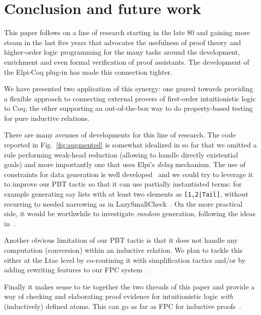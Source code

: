 \section{Conclusion and future work}

This paper follows on a line of research  starting in the late 80 and gaining more steam in the last five years that advocates the usefulness of proof theory and higher-order logic programming  for the many tasks around the development, enrichment and even formal verification of proof assistants. The development of the Elpi-Coq plug-in  has made this connection tighter.

We have presented two application of this synergy: one geared towards
providing a flexible approach to connecting external provers of
first-order intuitionistic logic to Coq; the other supporting an out-of-the-box way to do property-based testing for pure inductive relations.
%


There are many avenues of developments for this line of research.
The code reported in Fig.~\ref{fig:augmented} is somewhat idealized in
so far that we omitted a rule performing weak-head reduction (allowing
to handle directly existential goals) and more importantly one that uses
 Elpi's \emph{delay} mechanism. %
The
use of constraints for data generation is well
developed~\cite{FioravantiPS15} and we could try to leverage it to
improve our PBT tactic so that it can use partially instantiated terms: for example generating
say lists with at least two elements as \texttt{[1,2|Tail]}, without
recurring to needed narrowing as in 
LazySmallCheck~\cite{smallcheck}. On the more practical side, it would be worthwhile to investigate \emph{random} generation, following the ideas in~\cite{pltredexconstraintlogic,blanco19ppdp}.

Another obvious limitation of our PBT tactic is that it does not 
 handle any computation (conversion) within an inductive relation. We plan to tackle this either at the Ltac level by co-routining it with simplification tactics and/or by adding rewriting features to our FPC system~\cite{ChihaniM16}.

 Finally it makes sense to tie together the two threads of this paper
 and provide a way of checking and elaborating proof evidence for
 intuitionistic logic \emph{with} (inductively) defined atoms. This
 can go as far as FPC for inductive proofs~\cite{blanco15wof}.

